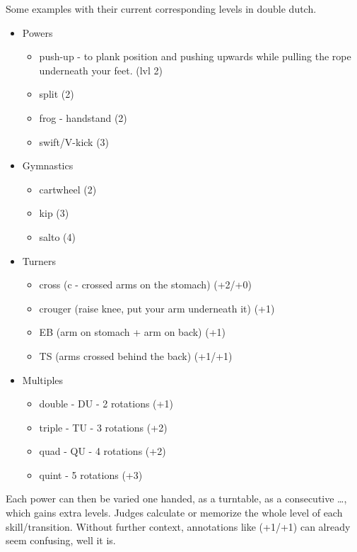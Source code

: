 Some examples with their current corresponding levels in double dutch.

\begin{itemize}
    \item Powers
    \begin{itemize}
        \item push-up - to plank position and pushing upwards while pulling the rope underneath your feet. (lvl 2)
        \item split (2)
        \item frog - handstand (2)
        \item swift/V-kick (3)
    \end{itemize}
    \item Gymnastics
    \begin{itemize}
        \item cartwheel (2)
        \item kip (3)
        \item salto (4)
    \end{itemize}
    \item Turners
    \begin{itemize}
        \item cross (c - crossed arms on the stomach) (+2/+0)
        \item crouger (raise knee, put your arm underneath it) (+1)
        \item EB (arm on stomach + arm on back) (+1)
        \item TS (arms crossed behind the back) (+1/+1)
    \end{itemize}
    \item Multiples
    \begin{itemize}
        \item double - DU - 2 rotations (+1)
        \item triple - TU - 3 rotations (+2)
        \item quad - QU - 4 rotations (+2)
        \item quint - 5 rotations (+3)
    \end{itemize}
\end{itemize}

Each power can then be varied one handed, as a turntable, as a consecutive \dots, which gains extra levels. Judges calculate or memorize the whole level of each skill/transition. Without further context, annotations like (+1/+1) can already seem confusing, well it is.



